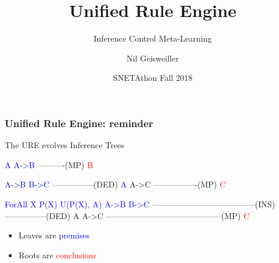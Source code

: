 \documentclass{beamer}
\title{Unified Rule Engine}
\subtitle{Inference Control Meta-Learning}
\author{Nil Geisweiller}
\institute[SingularityNET Foundation] %
{
  SingularityNET Foundation
}
\date[SNETAthon Fall 018] %
{SNETAthon Fall 2018}
\begin{document}
\frame
{
  \maketitle
}

\begin{frame}[fragile]
  \frametitle{Unified Rule Engine: reminder}
  The URE \alert{evolves Inference Trees}
{\tiny \begin{semiverbatim}
\textcolor{blue}{A  A->B}
----------(MP)      
   \textcolor{red}{B}
\end{semiverbatim}}

{\tiny \begin{semiverbatim}
    \textcolor{blue}{A->B  B->C}
    ---------------(DED)
\textcolor{blue}{A}      A->C       
----------------(MP)   
     \textcolor{red}{C}
\end{semiverbatim}}

{\tiny \begin{semiverbatim}
\textcolor{blue}{ForAll X P(X)  U(P(X), A)        A->B  B->C}
--------------------------------------(INS)   ---------------(DED)
            A                       A->C       
            ------------------------------------------(MP)
                           \textcolor{red}{C}
\end{semiverbatim}}

\begin{itemize}
\item Leaves are \textcolor{blue}{premises}
\item Roots are \textcolor{red}{conclusions}
\end{itemize}
  
\end{frame}
\end{document}
